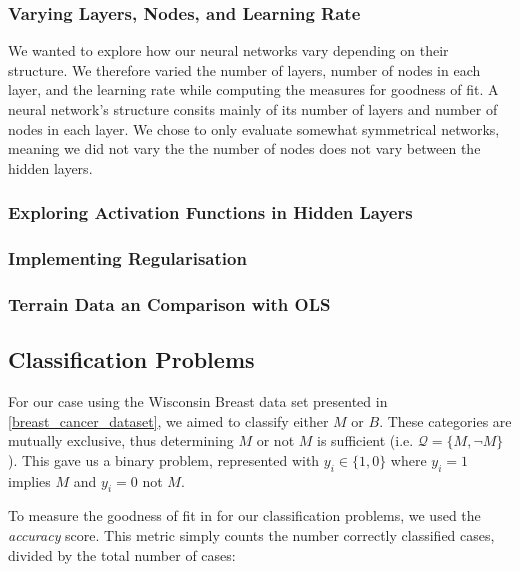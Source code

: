     \subsubsection{Varying Layers, Nodes, and Learning Rate}
        We wanted to explore how our neural networks vary depending on their structure. We therefore varied the number of layers, number of nodes in each layer, and the learning rate while computing the measures for goodness of fit.
        A neural network's structure consits mainly of its number of layers and number of nodes in each layer. We chose to only evaluate somewhat symmetrical networks, meaning we did not vary the the number of nodes does not vary between the hidden layers. 

    \subsubsection{Exploring Activation Functions in Hidden Layers}

    \subsubsection{Implementing Regularisation}

    \subsubsection{Terrain Data an Comparison with OLS}

    
\subsection{Classification Problems}
    For our case using the Wisconsin Breast data set presented in \cref{breast_cancer_dataset}, we aimed to classify either $M$ or $B$. These categories are mutually exclusive, thus determining $M$ or not $M$ is sufficient (i.e. $\mathcal{Q} = \{ M, \neg M \}$). This gave us a binary problem, represented with $y_i \in \{ 1, 0 \}$ where $y_i = 1$ implies $M$ and $y_i = 0$ not $M$.

    To measure the goodness of fit in for our classification problems, we used the \textit{accuracy} score. This metric simply counts the number correctly classified cases, divided by the total number of cases:

